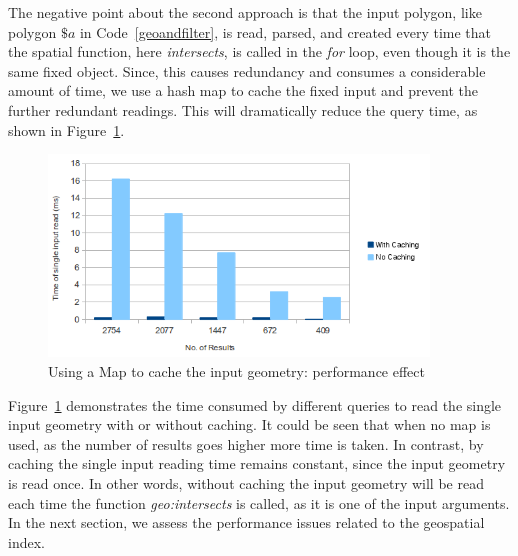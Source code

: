 \documentclass[a4paper,12pt]{article}
\begin{document}
\vspace{10px}
\vspace{10px}
The negative point about the second approach is that the input polygon, like polygon $\$a$ in Code~\ref{geoandfilter}, is read, parsed, and created every time that the spatial function, here \textit{intersects}, is called in the \textit{for} loop, even though it is the same fixed object. Since, this causes redundancy and consumes a considerable amount of time, we use a hash map to cache the fixed input and prevent the further redundant readings. This will dramatically reduce the query time, as shown in Figure~\ref{figMap}.
 \begin{figure}
\centering
\includegraphics[width=0.9\textwidth]{MapIndexing}
\caption{Using a Map to cache the input geometry: performance effect}
\label{figMap}
\end{figure}

Figure~\ref{figMap} demonstrates the time consumed by different queries to read the single input geometry with or without caching. It could be seen that when no map is used, as the number of results goes higher more time is taken. In contrast, by caching the single input reading time remains constant, since the input geometry is read once. In other words, without caching the input geometry will be read each time the function \textit{geo:intersects} is called, as it is one of the input arguments. In the next section, we assess the performance issues related to the geospatial index.
\end{document}
